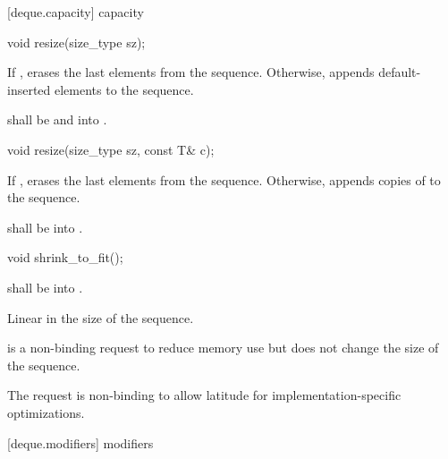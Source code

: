 [deque.capacity]{ capacity}

%
\begin{itemdecl}
void resize(size_type sz);
\end{itemdecl}

\begin{itemdescr}
\pnum
\effects If , erases the last  elements
from the sequence. Otherwise,
appends  default-inserted elements to the sequence.

\pnum
\requires {} shall be  and  into .
\end{itemdescr}

%
\begin{itemdecl}
void resize(size_type sz, const T& c);
\end{itemdecl}

\begin{itemdescr}
\pnum
\effects If , erases the last  elements
from the sequence. Otherwise,
appends  copies of  to the sequence.

\pnum
\requires {} shall be
 into .
\end{itemdescr}

%
\begin{itemdecl}
void shrink_to_fit();
\end{itemdecl}

\begin{itemdescr}
\pnum
\requires {} shall be  into .

\pnum
\complexity Linear in the size of the sequence.

\pnum
\remarks {} is a non-binding request to reduce memory use
but does not change the size of the sequence. \begin{note} The request is non-binding to allow latitude for implementation-specific optimizations. \end{note}
\end{itemdescr}

[deque.modifiers]{ modifiers}

